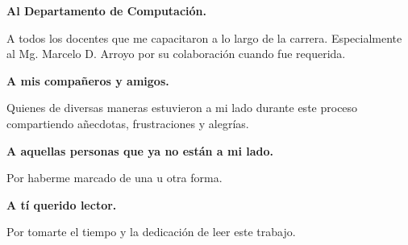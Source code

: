 \par \textbf{Al Departamento de Computación.}
\par A todos los docentes que me capacitaron a lo largo de la carrera. Especialmente al Mg. Marcelo D. Arroyo por su colaboración cuando fue requerida. \\

\par \textbf{A mis compañeros y amigos.}
\par Quienes de diversas maneras estuvieron a mi lado durante este proceso compartiendo añecdotas, frustraciones y alegrías. \\

\par \textbf{A aquellas personas que ya no están a mi lado.}
\par Por haberme marcado de una u otra forma. \\

\par \textbf{A tí querido lector.}
\par Por tomarte el tiempo y la dedicación de leer este trabajo. \\

\vskip 1cm

